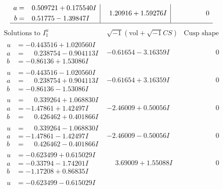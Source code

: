 \documentclass[1p]{elsarticle_modified}
\theoremstyle{definition}
\newcommand{\I}{\sqrt{-1}}
\begin{document}
$$\begin{array}{c|c|c}
\begin{aligned}
a &= \phantom{-}0.509721 + 0.175540 I \\
b &= \phantom{-}0.51775 - 1.39847 I\end{aligned}
 & \phantom{-}1.20916 + 1.59276 I & \phantom{-0.000000 } 0\\
 \hline 
 \end{array}$$\newpage$$\begin{array}{c|c|c}  
\text{Solutions to }I^u_{1}& \I (\text{vol} + \sqrt{-1}CS) & \text{Cusp shape}\\
 \hline 
\begin{aligned}
u &= -0.443516 + 1.020560 I \\
a &= \phantom{-}0.238754 - 0.904113 I \\
b &= -0.86136 + 1.53086 I\end{aligned}
 & -0.61654 - 3.16359 I & \phantom{-0.000000 } 0 \\ \hline\begin{aligned}
u &= -0.443516 - 1.020560 I \\
a &= \phantom{-}0.238754 + 0.904113 I \\
b &= -0.86136 - 1.53086 I\end{aligned}
 & -0.61654 + 3.16359 I & \phantom{-0.000000 } 0 \\ \hline\begin{aligned}
u &= \phantom{-}0.339264 + 1.068830 I \\
a &= -1.47861 + 1.42497 I \\
b &= \phantom{-}0.426462 + 0.401866 I\end{aligned}
 & -2.46009 + 0.50056 I & \phantom{-0.000000 } 0 \\ \hline\begin{aligned}
u &= \phantom{-}0.339264 - 1.068830 I \\
a &= -1.47861 - 1.42497 I \\
b &= \phantom{-}0.426462 - 0.401866 I\end{aligned}
 & -2.46009 - 0.50056 I & \phantom{-0.000000 } 0 \\ \hline\begin{aligned}
u &= -0.623499 + 0.615029 I \\
a &= -0.33794 - 1.74201 I \\
b &= -1.17208 + 0.86835 I\end{aligned}
 & \phantom{-}3.69009 + 1.55088 I & \phantom{-0.000000 } 0 \\ \hline\begin{aligned}
u &= -0.623499 - 0.615029 I \\

\end{aligned}
\end{array}$$
\end{document}
